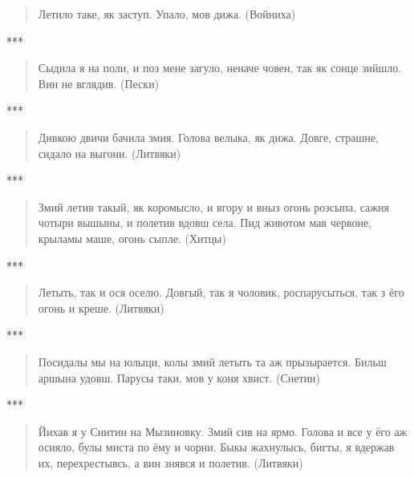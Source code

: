 \begin{quotation}
Летило таке, як заступ. Упало, мов дижа. (Войниха)
\end{quotation}

\begin{center}
***\end{center}

\begin{quotation}
Сыдила я на поли, и поз мене загуло, неначе човен, так як сонце зийшло. Вин не вглядив. (Пески)
\end{quotation}

\begin{center}
***\end{center}

\begin{quotation}
Дивкою двичи бачила змия. Голова велыка, як дижа. Довге, страшне, сидало на выгони. (Литвяки)
\end{quotation}

\begin{center}
***\end{center}

\begin{quotation}
Змий летив такый, як коромысло, и вгору и вныз огонь розсыпа, сажня чотыри вышыны, и полетив вдовш села. Пид животом мав червоне, крыламы маше, огонь сыпле. (Хитцы)
\end{quotation}

\begin{center}
***\end{center}

\begin{quotation}
Летыть, так и ося оселю. Довгый, так я чоловик, роспарусыться, так з ёго огонь и креше. (Литвяки)
\end{quotation}

\begin{center}
***\end{center}

\begin{quotation}
Посидалы мы на юлыци, колы змий летыть та аж прызырается. Бильш аршына удовш. Парусы таки, мов у коня хвист. (Снетин)
\end{quotation}

\begin{center}
***\end{center}

\begin{quotation}
Йихав я у Снитин на Мызиновку. Змий сив на ярмо. Голова и все у ёго аж осияло, булы миста по ёму и чорни. Быкы жахнулысь, бигты, я вдержав их, перехрестывсь, а вин знявся и полетив. (Литвяки)
\end{quotation}

